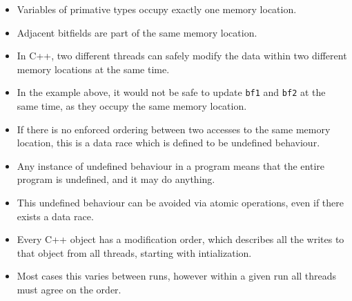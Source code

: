 \documentclass[11pt, a4paper]{article}
\theoremstyle{definition}
\theoremstyle{remark}
\newcommand{\code}[1]{\lstinline|#1|}
\begin{document}
\begin{itemize}
    \item Variables of primative types occupy exactly one memory location. 
    \item Adjacent bitfields are part of the same memory location.
    \item In C++, two different threads can safely modify the data within two different memory locations at the same time. 
    \item In the example above, it would not be safe to update \code{bf1} and \code{bf2} at the same time, as they occupy the same memory location. 
    \item If there is no enforced ordering between two accesses to the same memory location, this is a data race which is defined to be undefined behaviour. 
    \item Any instance of undefined behaviour in a program means that the entire program is undefined, and it may do anything. 
    \item This undefined behaviour can be avoided via atomic operations, even if there exists a data race.
    \item Every C++ object has a modification order, which describes all the writes to that object from all threads, starting with intialization. 
    \item Most cases this varies between runs, however within a given run all threads must agree on the order. 
\end{itemize}
\end{document}
